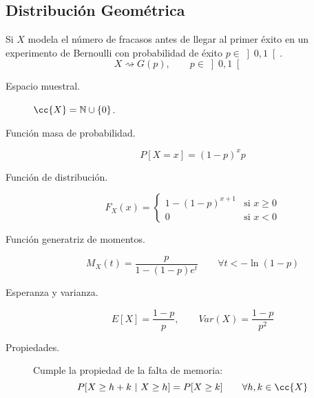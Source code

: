 \subsection{Distribución Geométrica}
\noindent
Si $X$ modela el número de fracasos antes de llegar al primer éxito en un experimento de Bernoulli con probabilidad de éxito $p\in \left]0,1\right[$.
\begin{equation*}
    X\rightsquigarrow G(p), \qquad p\in \left]0,1\right[
\end{equation*}
\begin{description}
    \item [Espacio muestral.] $\cc{X} = \mathbb{N}\cup \{0\}$.
    \item [Función masa de probabilidad.] 
        \begin{equation*}
            P[X=x] = {(1-p)}^{x}p
        \end{equation*}
    \item [Función de distribución.] 
        \begin{equation*}
            F_X(x) = \left\{\begin{array}{ll}
                1-{(1-p)}^{x+1} & \text{si\ } x\geq 0 \\
                 0 & \text{si\ } x < 0
            \end{array}\right. 
        \end{equation*}
    \item [Función generatriz de momentos.] 
        \begin{equation*}
            M_X(t) = \dfrac{p}{1-(1-p)e^t} \qquad \forall t < -\ln(1-p)
        \end{equation*}
    \item [Esperanza y varianza.] 
        \begin{equation*}
            E[X] = \dfrac{1-p}{p}, \qquad Var(X) = \dfrac{1-p}{p^2}
        \end{equation*}
    \item [Propiedades.] 
        Cumple la propiedad de la falta de memoria:
        \begin{equation*}
            P[X\geq h+k\ |\ X\geq h] = P[X\geq k] \qquad \forall h,k\in \cc{X}
        \end{equation*}
\end{description}

